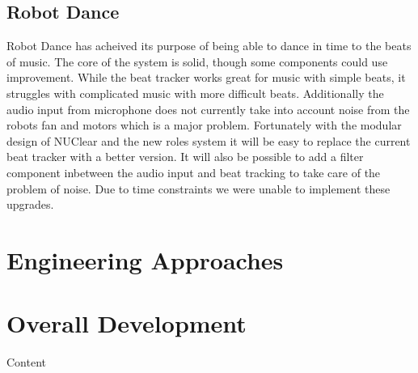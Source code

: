 \documentclass[a4paper]{article}
\begin{document}
	\subsection{Robot Dance}
		Robot Dance has acheived its purpose of being able to dance in time to the beats of music. The core of the system is solid, though some components could use improvement. While the beat tracker works great for music with simple beats, it struggles with complicated music with more difficult beats. Additionally the audio input from microphone does not currently take into account noise from the robots fan and motors which is a major problem. Fortunately with the modular design of NUClear and the new roles system it will be easy to replace the current beat tracker with a better version. It will also be possible to add a filter component inbetween the audio input and beat tracking to take care of the problem of noise. Due to time constraints we were unable to implement these upgrades.
\section{Engineering Approaches}
\section{Overall Development}

Content
\end{document}
